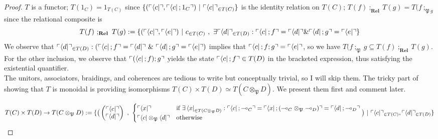 \begin{fullwidth}
\begin{theorem}
\begin{proof}
$T$ is a functor; $T(1_C) = 1_{T(C)}$ since $\{(\ulcorner \bra{c} \urcorner, \ulcorner \bra{c};1_C \urcorner) \ | \ \ulcorner \bra{c} \urcorner_{\in T(C)}\}$ is the identity relation on $T(C)$; $T(f) \ ;_\textbf{Rel} \ T(g) = T(f \ ;_{\mathfrak{P} \ g}$ since the relational composite is
$$T(f) \ ;_\textbf{Rel} \ T(g) := \{(\ulcorner \bra{c} \urcorner, \ulcorner \bra{e} \urcorner) \ | \ c_{\in T(C)} \ , \ \exists \ulcorner \bra{d} \urcorner_{\in T(D)} : \ulcorner \bra{c};f \urcorner = \ulcorner \bra{d} \urcorner \& \ulcorner \bra{d};g \urcorner = \ulcorner \bra{e} \urcorner\}$$ We observe that $\ulcorner \bra{d} \urcorner_{\in T(D)} : (\ulcorner \bra{c};f \urcorner = \ulcorner \bra{d} \urcorner \ \& \ \ulcorner \bra{d};g \urcorner = \ulcorner \bra{e} \urcorner)$ implies that $\ulcorner \bra{c};f;g \urcorner = \ulcorner \bra{e} \urcorner$, so we have $T(f \ ;_{\mathfrak{P}} \ g \subseteq T(f) \ ;_\textbf{Rel} \ T(g)$. For the other inclusion, we observe that $\ulcorner (\bra{c};f);g \urcorner$ yields the state $\ulcorner \bra{c};f \urcorner \in T(D)$ in the bracketed expression, thus satisfying the existential quantifier.\\

The unitors, associators, braidings, and coherences are tedious to write but conceptually trivial, so I will skip them. The tricky part of showing that $T$ is monoidal is providing isomorphisms $T(C) \times T(D) \simeq T(C \otimes_\mathfrak{P} D)$. We present them first and comment later.

\[T(C) \times T(D) \rightarrow T(C \otimes_\mathfrak{P} D) := \{ \big( \begin{pmatrix} \ulcorner \bra{c} \urcorner \\ \ulcorner \bra{d} \urcorner \end{pmatrix} \ , \ \begin{cases}\centering \ulcorner \bra{x} \urcorner & \text{if } \exists \bra{x}_{\in T(C \otimes_\mathfrak{P} D)} : \ulcorner \bra{c};\multimap_C \urcorner = \ulcorner \bra{x};(\multimap_C \otimes_\mathfrak{P} \multimap_{D}) \urcorner = \ulcorner \bra{d};\multimap_D \urcorner \\ \ulcorner \bra{c} \otimes_\mathfrak{P} \bra{d} \urcorner & \text{otherwise} \end{cases} \big) \ | \ \ulcorner \bra{c} \urcorner_{\in T(C)}, \ulcorner \bra{d} \urcorner_{\in T(D)} \}\]


\end{proof}
\end{theorem}
\end{fullwidth}
